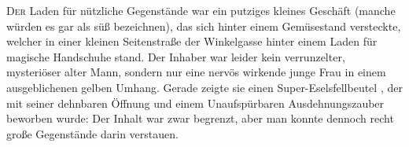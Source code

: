 \lettrine{D}{er} Laden für nützliche Gegenstände war ein putziges kleines Geschäft (manche würden es gar als süß bezeichnen), das sich hinter einem Gemüsestand versteckte, welcher in einer kleinen Seitenstraße der Winkelgasse hinter einem Laden für magische Handschuhe stand. Der Inhaber war leider kein verrunzelter, mysteriöser alter Mann, sondern nur eine nervös wirkende junge Frau in einem ausgeblichenen gelben Umhang. Gerade zeigte sie einen Super-Eselsfellbeutel , der mit seiner dehnbaren Öffnung und einem Unaufspürbaren Ausdehnungszauber beworben wurde: Der Inhalt war zwar begrenzt, aber man konnte dennoch recht große Gegenstände darin verstauen.

